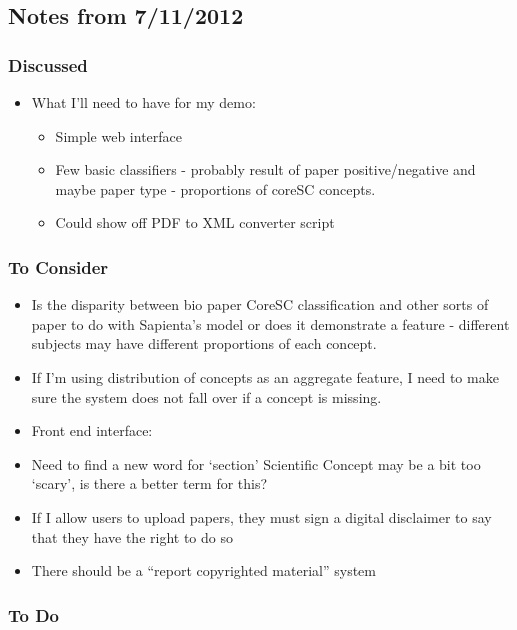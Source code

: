 \subsection{Notes from 7/11/2012}

\subsubsection{Discussed}

\begin{itemize}
\item
  What I'll need to have for my demo:

  \begin{itemize}
  \item
    Simple web interface
  \item
    Few basic classifiers - probably result of paper positive/negative
    and maybe paper type - proportions of coreSC concepts.
  \item
    Could show off PDF to XML converter script
  \end{itemize}
\end{itemize}

\subsubsection{To Consider}

\begin{itemize}
\item
  Is the disparity between bio paper CoreSC classification and other
  sorts of paper to do with Sapienta's model or does it demonstrate a
  feature - different subjects may have different proportions of each
  concept.
\item
  If I'm using distribution of concepts as an aggregate feature, I need
  to make sure the system does not fall over if a concept is missing.
\item
  Front end interface:
\item
  Need to find a new word for `section' Scientific Concept may be a bit
  too `scary', is there a better term for this?
\item
  If I allow users to upload papers, they must sign a digital disclaimer
  to say that they have the right to do so
\item
  There should be a ``report copyrighted material'' system
\end{itemize}

\subsubsection{To Do}

